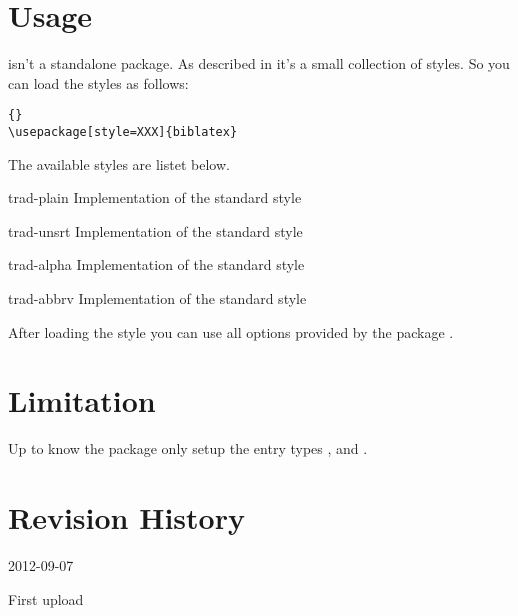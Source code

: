 \documentclass{ltxdockit}[2011/03/25]
\begin{document}
\section{Usage}

 isn't a standalone package. As described in  it's
a small collection of styles. So you can load the styles as follows:

\begin{lstlisting}[style=latex]{}
\usepackage[style=XXX]{biblatex}
\end{lstlisting}
The available styles are listet below.
\begin{marglist}

\item[trad-plain] Implementation of the standard style 
\item[trad-unsrt] Implementation of the standard style 
\item[trad-alpha] \BiberOnlyMark  Implementation of the standard style 
\item[trad-abbrv]  Implementation of the standard style 

\end{marglist}

After loading the style you can use all options provided by the package .

\section{Limitation}

Up to know the package only setup the entry types ,  and
.

\section{Revision History}
\label{apx:log}

\begin{changelog}

\begin{release}{0.1}{2012-09-07}
\item First upload
\end{release}

\end{changelog}
\end{document}
